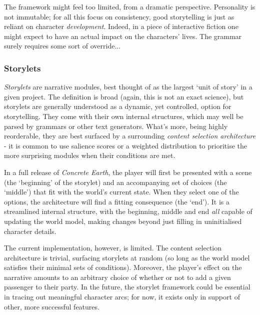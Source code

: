 \documentclass[a4paper, 11pt]{article}
\begin{document}
\begin{flushleft}
\vspace{5pt}\noindent
The framework might feel too limited, from a dramatic perspective. Personality is not immutable; for all this focus on consistency, good storytelling is just as reliant on character \textit{development}. Indeed, in a piece of interactive fiction one might expect to have an actual impact on the characters' lives. The grammar surely requires some sort of override...

\subsubsection{Storylets} 

\textit{Storylets} \citep{kreminskiStorylets} are narrative modules, best thought of as the largest `unit of story' in a given project. The definition is broad (again, this is not an exact science), but storylets are generally understood as a dynamic, yet controlled, option for storytelling. They come with their own internal structures, which may well be parsed by grammars or other text generators. What's more, being highly reorderable, they are best surfaced by a surrounding \textit{content selection architecture} - it is common to use salience scores or a weighted distribution to prioritise the more surprising modules when their conditions are met.

\vspace{5pt}\noindent
In a full release of \textit{Concrete Earth}, the player will first be presented with a scene (the `beginning' of the storylet) and an accompanying set of choices (the `middle') that fit with the world's current state. When they select one of the options, the architecture will find a fitting consequence (the `end'). It is a streamlined internal structure, with the beginning, middle and end \textit{all} capable of updating the world model, making changes beyond just filling in uninitialised character details.
 
\newpage\noindent
The current implementation, however, is limited. The content selection architecture is trivial, surfacing storylets at random (so long as the world model satisfies their minimal sets of conditions). Moreover, the player's effect on the narrative amounts to an arbitrary choice of whether or not to add a given passenger to their party. In the future, the storylet framework could be essential in tracing out meaningful character arcs; for now, it exists only in support of other, more successful features.


\end{flushleft}
\end{document}
